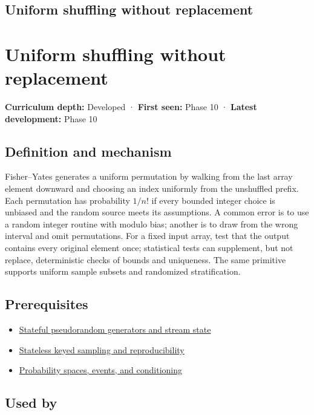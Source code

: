 \hypertarget{appendix-184fcc411663}{}
\section*{Uniform shuffling without replacement}
\chapter{Uniform shuffling without replacement}\label{appendix-184fcc411663-uniform-shuffling-without-replacement}

\textbf{Curriculum depth:} Developed · \textbf{First seen:} Phase 10 · \textbf{Latest development:} Phase 10

\section{Definition and mechanism}\label{appendix-184fcc411663-definition-and-mechanism}

Fisher--Yates generates a uniform permutation by walking from the last array element downward and choosing an index uniformly from the unshuffled prefix. Each permutation has probability \(1/n!\) if every bounded integer choice is unbiased and the random source meets its assumptions. A common error is to use a random integer routine with modulo bias; another is to draw from the wrong interval and omit permutations. For a fixed input array, test that the output contains every original element once; statistical tests can supplement, but not replace, deterministic checks of bounds and uniqueness. The same primitive supports uniform sample subsets and randomized stratification.

\section{Prerequisites}\label{appendix-184fcc411663-prerequisites}

\begin{itemize}
\tightlist
\item
  \hyperref[appendix-e0f7c7e08f3a]{Stateful pseudorandom generators and stream state}
\item
  \hyperref[appendix-daaf25bfd3a0]{Stateless keyed sampling and reproducibility}
\item
  \hyperref[appendix-f1ef323f6ed7]{Probability spaces, events, and conditioning}
\end{itemize}

\section{Used by}\label{appendix-184fcc411663-used-by}

